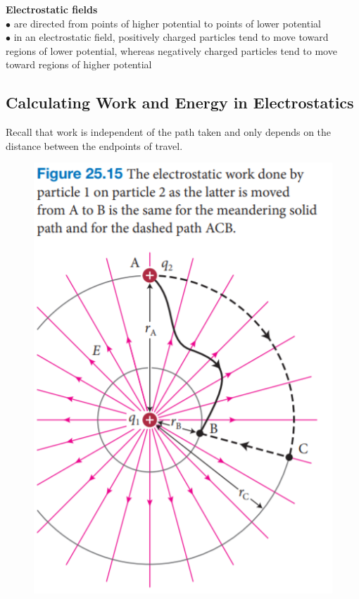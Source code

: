         \textbf{Electrostatic fields} \\
        $\bullet$ are directed from points of higher potential to points of lower potential \\
        $\bullet$ in an electrostatic field, positively charged particles tend to move toward regions of lower potential, whereas negatively charged particles tend to move toward regions of higher potential

    \subsection{Calculating Work and Energy in Electrostatics}      %

        Recall that work is independent of the path taken and only depends on the distance between the endpoints of travel.

        \begin{figure}[hbt!]
            \centering
            \includegraphics[scale = 0.75]{Resources/25.4_Work}
        \end{figure}

